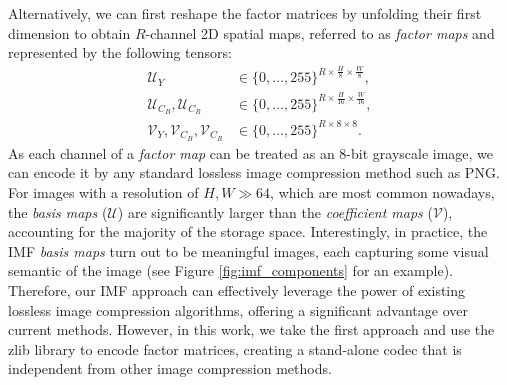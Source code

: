 Alternatively, we can first reshape the factor matrices by unfolding their first dimension to obtain $R$-channel 2D spatial maps, referred to as \emph{factor maps} and represented by the following tensors:
\begin{align} \label{eq:reshaped_factors}
    \bm{\mathcal{U}}_{Y}                                                 & \in \{0, \ldots, 255\}^{R \times \frac{H}{8} \times \frac{W}{8}}, \nonumber \\
    \bm{\mathcal{U}}_{C_B}, \bm{\mathcal{U}}_{C_R}                       & \in \{0, \ldots, 255\}^{R \times \frac{H}{16} \times \frac{W}{16}},         \\
    \bm{\mathcal{V}}_{Y}, \bm{\mathcal{V}}_{C_B}, \bm{\mathcal{V}}_{C_R} & \in \{0, \ldots, 255\}^{R \times 8 \times 8}. \nonumber
\end{align}
As each channel of a \emph{factor map} can be treated as an 8-bit grayscale image, we can encode it by any standard lossless image compression method such as PNG. For images with a resolution of $H, W \gg 64$, which are most common nowadays, the \emph{basis maps} ($\bm{\mathcal{U}}$) are significantly larger than the \emph{coefficient maps} ($\bm{\mathcal{V}}$), accounting for the majority of the storage space. Interestingly, in practice, the IMF \emph{basis maps} turn out to be meaningful images, each capturing some visual semantic of the image (see Figure \ref{fig:imf_components} for an example). Therefore, our IMF approach can effectively leverage the power of existing lossless image compression algorithms, offering a significant advantage over current methods. However, in this work, we take the first approach and use the zlib library \cite{deutsch1996zlib} to encode factor matrices, creating a stand-alone codec that is independent from other image compression methods.

